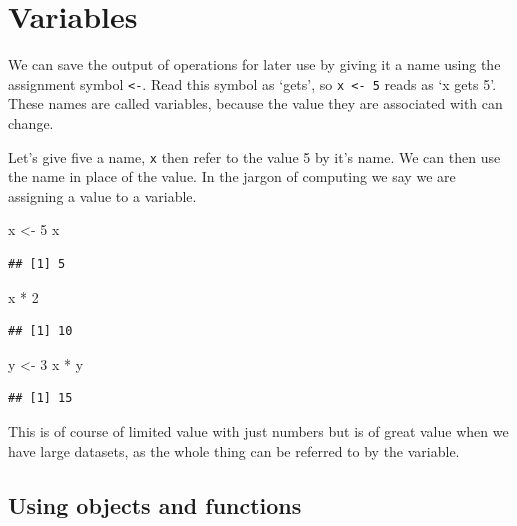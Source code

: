 \documentclass[
]{book}
\newenvironment{Shaded}{\begin{snugshade}}{\end{snugshade}}
\newcommand{\DecValTok}[1]{\textcolor[rgb]{0.00,0.00,0.81}{#1}}
\newcommand{\NormalTok}[1]{#1}
\newcommand{\OtherTok}[1]{\textcolor[rgb]{0.56,0.35,0.01}{#1}}
\newcommand{\SpecialCharTok}[1]{\textcolor[rgb]{0.00,0.00,0.00}{#1}}
\begin{document}
\hypertarget{variables}{%
\section{Variables}\label{variables}}

We can save the output of operations for later use by giving it a name using the assignment symbol \texttt{\textless{}-}. Read this symbol as `gets', so \texttt{x\ \textless{}-\ 5} reads as `x gets 5'. These names are called variables, because the value they are associated with can change.

Let's give five a name, \texttt{x} then refer to the value 5 by it's name. We can then use the name in place of the value. In the jargon of computing we say we are assigning a value to a variable.

\begin{Shaded}
\begin{Highlighting}[]
\NormalTok{ x }\OtherTok{\textless{}{-}} \DecValTok{5}
\NormalTok{ x}
\end{Highlighting}
\end{Shaded}

\begin{verbatim}
## [1] 5
\end{verbatim}

\begin{Shaded}
\begin{Highlighting}[]
\NormalTok{ x }\SpecialCharTok{*} \DecValTok{2}
\end{Highlighting}
\end{Shaded}

\begin{verbatim}
## [1] 10
\end{verbatim}

\begin{Shaded}
\begin{Highlighting}[]
\NormalTok{y }\OtherTok{\textless{}{-}} \DecValTok{3}
\NormalTok{x }\SpecialCharTok{*}\NormalTok{ y}
\end{Highlighting}
\end{Shaded}

\begin{verbatim}
## [1] 15
\end{verbatim}

This is of course of limited value with just numbers but is of great value when we have large datasets, as the whole thing can be referred to by the variable.

\hypertarget{using-objects-and-functions}{%
\subsection{Using objects and functions}\label{using-objects-and-functions}}
\end{document}
